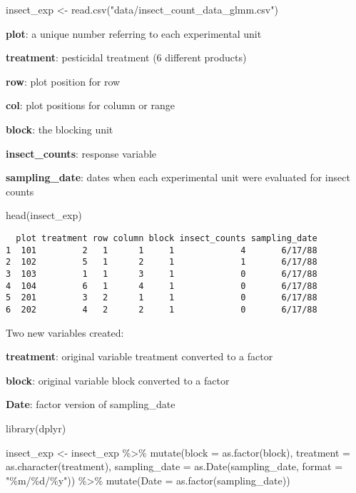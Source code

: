\documentclass[
  letterpaper,
  DIV=11,
  numbers=noendperiod]{scrreprt}
\newenvironment{Shaded}{\begin{snugshade}}{\end{snugshade}}
\newcommand{\AttributeTok}[1]{\textcolor[rgb]{0.40,0.45,0.13}{#1}}
\newcommand{\FunctionTok}[1]{\textcolor[rgb]{0.28,0.35,0.67}{#1}}
\newcommand{\NormalTok}[1]{\textcolor[rgb]{0.00,0.23,0.31}{#1}}
\newcommand{\OtherTok}[1]{\textcolor[rgb]{0.00,0.23,0.31}{#1}}
\newcommand{\SpecialCharTok}[1]{\textcolor[rgb]{0.37,0.37,0.37}{#1}}
\newcommand{\StringTok}[1]{\textcolor[rgb]{0.13,0.47,0.30}{#1}}
\begin{document}
\begin{Shaded}
\begin{Highlighting}[]
\NormalTok{insect\_exp }\OtherTok{\textless{}{-}} \FunctionTok{read.csv}\NormalTok{(}\StringTok{"data/insect\_count\_data\_glmm.csv"}\NormalTok{)}
\end{Highlighting}
\end{Shaded}

\textbf{plot}: a unique number referring to each experimental unit

\textbf{treatment}: pesticidal treatment (6 different products)

\textbf{row}: plot position for row

\textbf{col}: plot positions for column or range

\textbf{block}: the blocking unit

\textbf{insect\_counts}: response variable

\textbf{sampling\_date}: dates when each experimental unit were
evaluated for insect counts

\begin{Shaded}
\begin{Highlighting}[]
\FunctionTok{head}\NormalTok{(insect\_exp)}
\end{Highlighting}
\end{Shaded}

\begin{verbatim}
  plot treatment row column block insect_counts sampling_date
1  101         2   1      1     1             4       6/17/88
2  102         5   1      2     1             1       6/17/88
3  103         1   1      3     1             0       6/17/88
4  104         6   1      4     1             0       6/17/88
5  201         3   2      1     1             0       6/17/88
6  202         4   2      2     1             0       6/17/88
\end{verbatim}

Two new variables created:

\textbf{treatment}: original variable treatment converted to a factor

\textbf{block}: original variable block converted to a factor

\textbf{Date}: factor version of sampling\_date

\begin{Shaded}
\begin{Highlighting}[]
\FunctionTok{library}\NormalTok{(dplyr)}

\NormalTok{insect\_exp }\OtherTok{\textless{}{-}}\NormalTok{ insect\_exp }\SpecialCharTok{\%\textgreater{}\%} 
  \FunctionTok{mutate}\NormalTok{(}\AttributeTok{block =} \FunctionTok{as.factor}\NormalTok{(block), }
         \AttributeTok{treatment =} \FunctionTok{as.character}\NormalTok{(treatment), }
         \AttributeTok{sampling\_date =} \FunctionTok{as.Date}\NormalTok{(sampling\_date, }\AttributeTok{format =} \StringTok{"\%m/\%d/\%y"}\NormalTok{)) }\SpecialCharTok{\%\textgreater{}\%} 
  \FunctionTok{mutate}\NormalTok{(}\AttributeTok{Date =} \FunctionTok{as.factor}\NormalTok{(sampling\_date))}
\end{Highlighting}
\end{Shaded}
\end{document}

